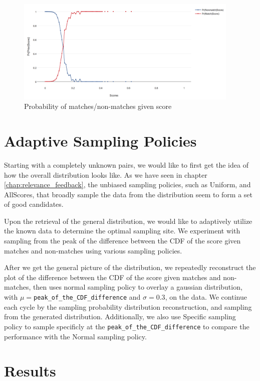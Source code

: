 \begin{figure}[h]
  \centering
  \includegraphics[width=0.95\textwidth]{dataset/otago/pms}
  \caption{Probability of matches/non-matches given score}
  \label{fig:pms_grand}
\end{figure}

\section{Adaptive Sampling Policies} %
\label{sec:sampling_policies}

Starting with a completely unknown pairs, we would like to first get the idea of how the overall distribution looks like. As we have seen in chapter \ref{chap:relevance_feedback}, the unbiased sampling policies, such as Uniform, and AllScores, that broadly sample the data from the distribution seem to form a set of good candidates.

Upon the retrieval of the general distribution, we would like to adaptively utilize the known data to determine the optimal sampling site. We experiment with sampling from the peak of the difference between the CDF of the score given matches and non-matches using various sampling policies.

After we get the general picture of the distribution, we repeatedly reconstruct the plot of the difference between the CDF of the score given matches and non-matches, then uses normal sampling policy to overlay a gaussian distribution, with $\mu=$\texttt{peak\_of\_the\_CDF\_difference} and $\sigma=0.3$, on the data. We continue each cycle by the sampling probability distribution reconstruction, and sampling from the generated distribution. Additionally, we also use Specific sampling policy to sample specificly at the \texttt{peak\_of\_the\_CDF\_difference} to compare the performance with the Normal sampling policy.

\section{Results}

